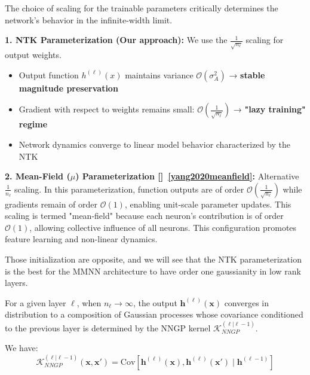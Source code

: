 \documentclass[a4paper]{article}
\theoremstyle{plain}
\theoremstyle{definition}
\theoremstyle{remark}
\begin{document}
\begin{tcolorbox}[colback=green!5,colframe=green!80!black,title={\textbf{Remark: Critical Parameterization Choice}},enhanced,drop shadow,boxrule=2pt]
The choice of scaling for the trainable parameters critically determines the network's behavior in the infinite-width limit. 

\textbf{1. NTK Parameterization (Our approach):} We use the $\frac{1}{\sqrt{n_\ell}}$ scaling for output weights.
\begin{itemize}
\item Output function $h^{(\ell)}(x)$ maintains variance $\mathcal{O}(\sigma_A^2)$ → \textbf{stable magnitude preservation}
\item Gradient with respect to weights remains small: $\mathcal{O}(\frac{1}{\sqrt{n_\ell}})$ → \textbf{"lazy training" regime}
\item Network dynamics converge to linear model behavior characterized by the NTK
\end{itemize}

\textbf{2. Mean-Field ($\mu$) Parameterization []~\ref{yang2020meanfield}:} Alternative $\frac{1}{n_\ell}$ scaling.
In this parameterization, function outputs are of order $\mathcal{O}(\frac{1}{\sqrt{n_\ell}})$ while gradients remain of order $\mathcal{O}(1)$, enabling unit-scale parameter updates. This scaling is termed "mean-field" because each neuron's contribution is of order $\mathcal{O}(1)$, allowing collective influence of all neurons. This configuration promotes feature learning and non-linear dynamics.

Those initialization are opposite, and we will see that the NTK parameterization is the best for the MMNN architecture to have order one gaussianity in low rank layers.
\end{tcolorbox}






\begin{tcolorbox}[colback=yellow!5,colframe=yellow!80!black,title={\textbf{Definition: Neural Network Gaussian Process (NNGP)}},enhanced,drop shadow,boxrule=2pt]
For a given layer $\ell$, when $n_\ell \to \infty$, the output $\bm{h}^{(\ell)}(\bm{x})$ converges in 
distribution to a composition of Gaussian processes whose covariance conditioned to the previous layer is determined by the NNGP kernel $\mathcal{K}_{NNGP}^{(\ell | \ell-1)}$.

We have:
\begin{equation}
\mathcal{K}_{NNGP}^{(\ell | \ell-1 )}(\bm{x}, \bm{x}') = \text{Cov}\left[\bm{h}^{(\ell)}(\bm{x}), \bm{h}^{(\ell)}(\bm{x}') \mid \bm{h}^{(\ell-1)}\right]
\end{equation}
\end{tcolorbox}
\end{document}
